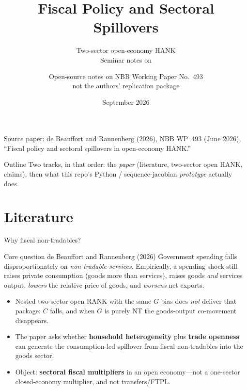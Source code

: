 \documentclass[11pt,aspectratio=169]{beamer}
\title[Fiscal policy \& sectoral spillovers]{Fiscal Policy and Sectoral Spillovers}
\subtitle{\texorpdfstring{Two-sector open-economy HANK\\
{\normalsize Seminar notes on \paper}}{Open-economy HANK seminar notes}}
\author[Prototype slides]{\texorpdfstring{Open-source notes on NBB Working Paper No.~493\\
{\small not the authors' replication package}}{Open-source prototype slides (not the authors' package)}}
\institute[MacroModellerBot]{\texttt{de-beauffort-rannenberg/} in MacroModellerBot}
\date{September 2026}
\newcommand{\paper}{de Beauffort and Rannenberg (2026)}
\begin{document}
\begin{frame}[plain]
  \titlepage
  \vspace{-1.2em}
  \begin{center}
    {\footnotesize
    Source paper: \paper, NBB WP~493 (June 2026),\\
    ``Fiscal policy and sectoral spillovers in open-economy HANK.''}
  \end{center}
\end{frame}

\begin{frame}{Outline}
  \tableofcontents
  \vspace{0.8em}
  {\footnotesize Two tracks, in that order: the \emph{paper} (literature, two-sector
  open HANK, claims), then what this repo's Python / sequence-jacobian
  \emph{prototype} actually does.}
\end{frame}

\section{Literature}
\begin{frame}{Why fiscal non-tradables?}
  \begin{block}{Core question \paper}
    Government spending falls disproportionately on \emph{non-tradable services}.
    Empirically, a spending shock still raises private consumption (goods more
    than services), raises goods \emph{and} services output, \emph{lowers} the
    relative price of goods, and \emph{worsens} net exports.
  \end{block}
  \begin{itemize}
    \item Nested two-sector open RANK with the same $G$ bias does \emph{not}
          deliver that package: $C$ falls, and when $G$ is purely NT the
          goods-output co-movement disappears.
    \item The paper asks whether \textbf{household heterogeneity} plus
          \textbf{trade openness} can generate the consumption-led spillover
          from fiscal non-tradables into the goods sector.
    \item Object: \textbf{sectoral fiscal multipliers} in an open economy---not
          a one-sector closed-economy multiplier, and not transfers/FTPL.
  \end{itemize}
\end{frame}
\end{document}

